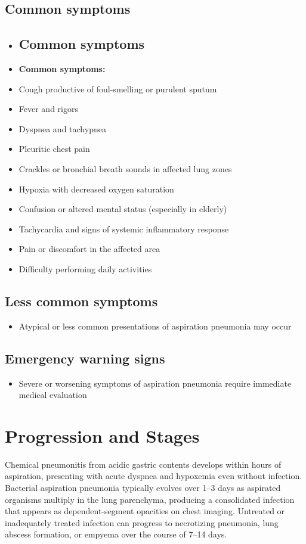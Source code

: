 \subsection{Common symptoms}
\begin{itemize}[noitemsep]
  \item \subsection{Common symptoms}
  \item \textbf{Common symptoms:}
  \item Cough productive of foul-smelling or purulent sputum
  \item Fever and rigors
  \item Dyspnea and tachypnea
  \item Pleuritic chest pain
  \item Crackles or bronchial breath sounds in affected lung zones
  \item Hypoxia with decreased oxygen saturation
  \item Confusion or altered mental status (especially in elderly)
  \item Tachycardia and signs of systemic inflammatory response
  \item Pain or discomfort in the affected area
  \item Difficulty performing daily activities
\end{itemize}

\subsection{Less common symptoms}
\begin{itemize}[noitemsep]
  \item Atypical or less common presentations of aspiration pneumonia may occur
\end{itemize}

\subsection{Emergency warning signs}
\begin{itemize}[noitemsep]
  \item Severe or worsening symptoms of aspiration pneumonia require immediate medical evaluation
\end{itemize}
\section{Progression and Stages}
Chemical pneumonitis from acidic gastric contents develops within hours of aspiration, presenting with acute dyspnea and hypoxemia even without infection. Bacterial aspiration pneumonia typically evolves over 1--3 days as aspirated organisms multiply in the lung parenchyma, producing a consolidated infection that appears as dependent-segment opacities on chest imaging. Untreated or inadequately treated infection can progress to necrotizing pneumonia, lung abscess formation, or empyema over the course of 7--14 days.

